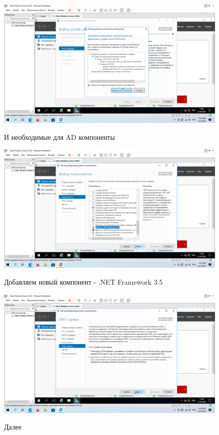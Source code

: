 \documentclass[a4paper]{article}
\begin{document}
  \begin{figure}[H]
    \centering
    \includegraphics[width=\textwidth]{11_0009}
    \label{img:9}
    \caption{И необходимые для AD компоненты}
  \end{figure}

  \begin{figure}[H]
    \centering
    \includegraphics[width=\textwidth]{11_0011}
    \label{img:11}
    \caption{Добавляем новый компонент - .NET Framework 3.5}
  \end{figure}

  \begin{figure}[H]
    \centering
    \includegraphics[width=\textwidth]{11_0012}
    \label{img:12}
    \caption{Далее}
  \end{figure}
\end{document}
